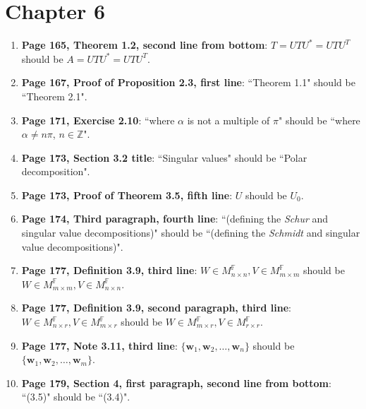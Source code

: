 \documentclass{article}
\begin{document}
\section*{Chapter 6}
\begin{enumerate}[leftmargin=*]
    \item \textbf{Page 165, Theorem 1.2, second line from bottom}: 
          $T=UTU^*=UTU^T$ should be $A=UTU^*=UTU^T$.
    
    \item \textbf{Page 167, Proof of Proposition 2.3, first line}: 
          ``Theorem 1.1" should be ``Theorem 2.1".
    
    \item \textbf{Page 171, Exercise 2.10}: 
          ``where $\alpha$ is not a multiple of $\pi$" should be 
          ``where $\alpha \ne n\pi$, $n \in \mathbb{Z}$".
    
    \item \textbf{Page 173, Section 3.2 title}: 
          ``Singular values" should be ``Polar decomposition".
    
    \item \textbf{Page 173, Proof of Theorem 3.5, fifth line}: 
          $U$ should be $U_0$.
    
    \item \textbf{Page 174, Third paragraph, fourth line}: 
          ``(defining the {\it Schur} and singular value decompositions)" should be 
          ``(defining the {\it Schmidt} and singular value decompositions)".
    
    \item \textbf{Page 177, Definition 3.9, third line}: 
          $W \in M_{n\times n}^{\mathbb{F}}, V \in M_{m\times m}^{\mathbb{F}}$ should be 
          $W \in M_{m\times m}^{\mathbb{F}}, V \in M_{n\times n}^{\mathbb{F}}$.
    
    \item \textbf{Page 177, Definition 3.9, second paragraph, third line}: 
          $W \in M_{n\times r}^{\mathbb{F}}, V \in M_{m\times r}^{\mathbb{F}}$ should be 
          $W \in M_{m\times r}^{\mathbb{F}}, V \in M_{r\times r}^{\mathbb{F}}$.
    
    \item \textbf{Page 177, Note 3.11, third line}: 
          $\{\mathbf{w}_{1},\mathbf{w}_{2},\ldots,\mathbf{w}_{n}\}$ should be 
          $\{\mathbf{w}_{1},\mathbf{w}_{2},\ldots,\mathbf{w}_{m}\}$.
    
    \item \textbf{Page 179, Section 4, first paragraph, second line from bottom}: 
          ``(3.5)" should be ``(3.4)".
    

\end{enumerate}
\end{document}
